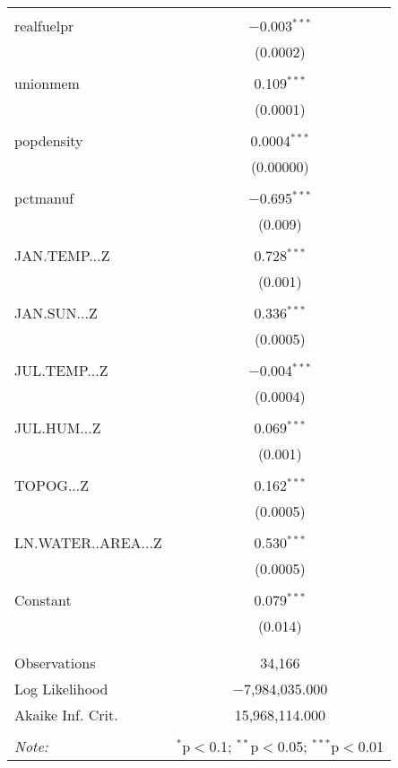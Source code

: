 \begin{table}[!htbp]
\begin{tabular}{@{\extracolsep{5pt}}lc}
  & \\ 
 realfuelpr & $-$0.003$^{***}$ \\ 
  & (0.0002) \\ 
  & \\ 
 unionmem & 0.109$^{***}$ \\ 
  & (0.0001) \\ 
  & \\ 
 popdensity & 0.0004$^{***}$ \\ 
  & (0.00000) \\ 
  & \\ 
 pctmanuf & $-$0.695$^{***}$ \\ 
  & (0.009) \\ 
  & \\ 
 JAN.TEMP...Z & 0.728$^{***}$ \\ 
  & (0.001) \\ 
  & \\ 
 JAN.SUN...Z & 0.336$^{***}$ \\ 
  & (0.0005) \\ 
  & \\ 
 JUL.TEMP...Z & $-$0.004$^{***}$ \\ 
  & (0.0004) \\ 
  & \\ 
 JUL.HUM...Z & 0.069$^{***}$ \\ 
  & (0.001) \\ 
  & \\ 
 TOPOG...Z & 0.162$^{***}$ \\ 
  & (0.0005) \\ 
  & \\ 
 LN.WATER..AREA...Z & 0.530$^{***}$ \\ 
  & (0.0005) \\ 
  & \\ 
 Constant & 0.079$^{***}$ \\ 
  & (0.014) \\ 
  & \\ 
\hline \\[-1.8ex] 
Observations & 34,166 \\ 
Log Likelihood & $-$7,984,035.000 \\ 
Akaike Inf. Crit. & 15,968,114.000 \\ 
\hline 
\hline \\[-1.8ex] 
\textit{Note:}  & \multicolumn{1}{r}{$^{*}$p$<$0.1; $^{**}$p$<$0.05; $^{***}$p$<$0.01} \\ 
\end{tabular} 
\end{table} 
